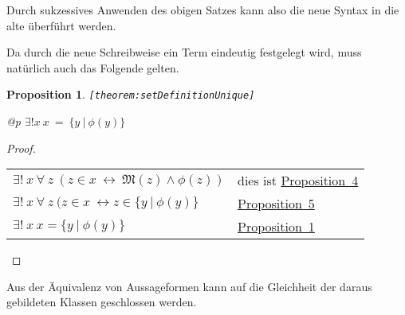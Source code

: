 \documentclass[a4paper,german,10pt,twoside]{book}
\newtheorem{prop}[thm]{Proposition}
\theoremstyle{definition}
\theoremstyle{remark}
\begin{document}
Durch sukzessives Anwenden des obigen Satzes kann also die neue Syntax in die alte {\"u}berf{\"u}hrt werden.


\par
Da durch die neue Schreibweise ein Term eindeutig festgelegt wird, muss nat{\"u}rlich auch das Folgende gelten.

\begin{prop}
\label{theorem:setDefinitionUnique} \hypertarget{theorem:setDefinitionUnique}{}
{\tt \tiny [\verb]theorem:setDefinitionUnique]]}
\mbox{}
\begin{longtable}{{@{\extracolsep{\fill}}p{\linewidth}}}
\centering $\exists! x\ x \ = \ \{ y \ | \ \phi(y) \} $
\end{longtable}

\end{prop}
\begin{proof}
\mbox{}
\par
\begin{tabularx}{\linewidth}{lX}
  $\exists! \ x \ \forall \ z \ ( z \in x \ \leftrightarrow \ \mathfrak{M}(z) \land \phi(z))$
    & dies ist \hyperlink{theorem:comprehension}{Proposition~4} \\
  $\exists! \ x \ \forall \ z \ ( z \in x \ \leftrightarrow z \in \{ y \ | \  \phi(y) \}$
    & \hyperlink{theorem:setNotation}{Proposition~5} \\
  $\exists! \ x \ x = \{ y \ | \  \phi(y) \}$
    & \hyperlink{theorem:extensonalityEquivalence}{Proposition~1}
\end{tabularx}
\end{proof}


\par
Aus der {\"A}quivalenz von Aussageformen kann auf die Gleichheit der daraus gebildeten Klassen geschlossen werden.
\end{document}
